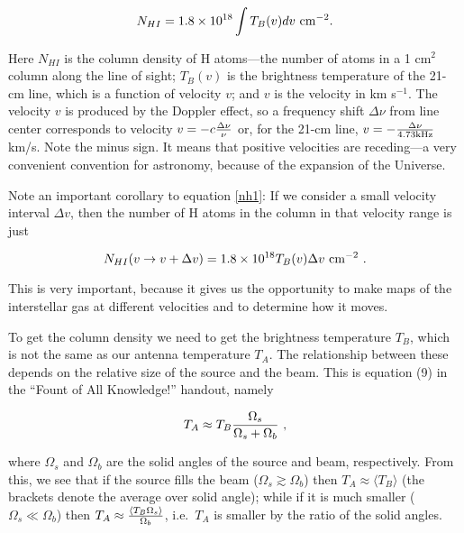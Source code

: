 \documentclass[psfig,preprint]{aastex}
\begin{document}
\begin{equation} \label{nh1}
N_{HI} = 1.8 \times 10^{18} \int T_{B}(v) dv \ {\rm cm^{-2}}. 
\end{equation}

\noindent Here $N_{HI}$ is the column density of H atoms---the number of
atoms in a 1 cm$^2$ column along the line of sight; $T_{B}(v)$ is the
brightness temperature of the 21-cm line, which is a function of 
velocity $v$; and $v$ is the velocity in km s$^{-1}$. The velocity $v$
is produced by the Doppler effect, so a frequency shift $\Delta \nu$
from line center corresponds to velocity $v = - c {\Delta \nu \over
\nu}$ or, for the 21-cm line, $v = -{\Delta \nu \over 4.73 {\rm kHz}}$ km/s.
Note the minus sign. It means that positive velocities are receding---a
very convenient convention for astronomy, because of the expansion of
the Universe. 

          Note an important corollary to equation \ref{nh1}: If we
consider a small velocity interval $\Delta v$, then the number of H
atoms in the column in that velocity range is just 

\begin{equation} \label{nh2}
N_{HI}(v \rightarrow v + \Delta v) = 1.8 \times 10^{18} T_{B}(v) \Delta
v \ {\rm cm^{-2}} \ .  
\end{equation}

\noindent This is very important, because it gives us the opportunity to
make maps of the interstellar gas at different velocities and to
determine how it moves.

	To get the column density we need to get the brightness
temperature $T_B$, which is not the same as our antenna temperature
$T_A$. The relationship between these depends on the relative size of
the source and the beam. This is equation (9) in the ``Fount of All
Knowledge!'' handout, namely 

\begin{equation} \label{taeqn}
T_A \approx T_B {\Omega_s \over \Omega_s + \Omega_b} \ ,
\end{equation}

\noindent where $\Omega_s$ and $\Omega_b$ are the solid angles of the
source and beam, respectively. From this, we see that if the source
fills the beam ($\Omega_s \gtrsim \Omega_b$) then $T_A \approx \langle
T_B\rangle$ (the brackets denote the average over solid angle);
while if it is much smaller ($\Omega_s \ll \Omega_b$) then $T_A \approx
{\langle T_B \Omega_s\rangle \over \Omega_b}$, i.e.\ $T_A$ is smaller by the ratio of
the solid angles. 
\end{document}
